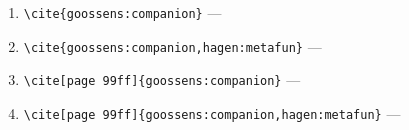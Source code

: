 \documentclass[12pt]{article}
\begin{document}
\begin{enumerate}
\item
\verb|\cite{goossens:companion}| ---
\cite{goossens:companion}
\item
\verb|\cite{goossens:companion,hagen:metafun}| ---
\cite{goossens:companion,hagen:metafun}
\item
\verb|\cite[page 99ff]{goossens:companion}| ---
\cite[page 99ff]{goossens:companion}
\item
\verb|\cite[page 99ff]{goossens:companion,hagen:metafun}| ---
\cite[page 99ff]{goossens:companion,hagen:metafun}
\end{enumerate}


\end{document}
